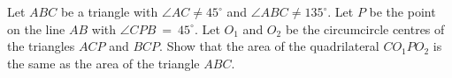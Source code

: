 Let $ABC$ be a triangle with $\angle AC \neq 45^\circ$ and $\angle ABC \neq 135^\circ$.
Let $P$ be the point on the line $AB$ with $\angle CPB~=~45^\circ$.
Let $O_1$ and $O_2$ be the circumcircle centres of the triangles $ACP$ and $BCP$.
Show that the area of the quadrilateral $CO_1PO_2$ is the same as the area of the triangle $ABC$.